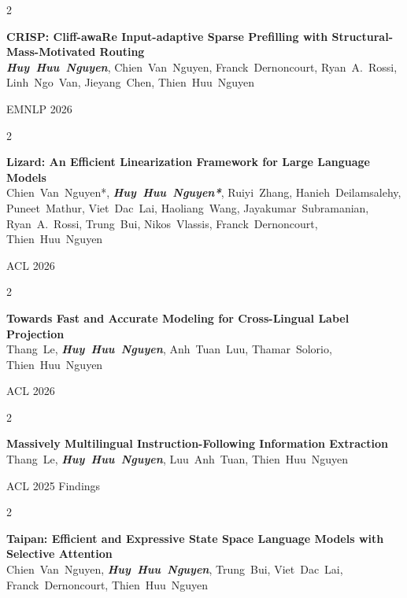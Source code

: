 \documentclass[10pt, letterpaper]{article}
\newenvironment{twocolentry}[2][]{
    \onecolentry
    \def\secondColumn{#2}
    \setcolumnwidth{\fill, 4.5 cm}
    \begin{paracol}{2}
}{
    \switchcolumn \raggedleft \secondColumn
    \end{paracol}
    \endonecolentry
} %
\let\hrefWithoutArrow\href
\renewcommand{\href}[2]{\hrefWithoutArrow{#1}{\ifthenelse{\equal{#2}{}}{ }{#2 }\raisebox{.15ex}{\footnotesize \faExternalLink*}}}
\begin{document}
\begin{samepage}
    \begin{twocolentry}{EMNLP 2026}
        \textbf{CRISP: Cliff-awaRe Input-adaptive Sparse Prefilling with Structural-Mass-Motivated Routing} \\
        \mbox{\textbf{\textit{Huy Huu Nguyen}}}, \mbox{Chien Van Nguyen}, \mbox{Franck Dernoncourt}, \mbox{Ryan A. Rossi}, \mbox{Linh Ngo Van}, \mbox{Jieyang Chen}, \mbox{Thien Huu Nguyen}
    \end{twocolentry}

    \vspace{0.10 cm}

    \begin{twocolentry}{ACL 2026}
        \textbf{Lizard: An Efficient Linearization Framework for Large Language Models} \\
        \mbox{Chien Van Nguyen*}, \mbox{\textbf{\textit{Huy Huu Nguyen*}}}, \mbox{Ruiyi Zhang}, \mbox{Hanieh Deilamsalehy}, \mbox{Puneet Mathur}, \mbox{Viet Dac Lai}, \mbox{Haoliang Wang}, \mbox{Jayakumar Subramanian}, \mbox{Ryan A. Rossi}, \mbox{Trung Bui}, \mbox{Nikos Vlassis}, \mbox{Franck Dernoncourt}, \mbox{Thien Huu Nguyen}
    \end{twocolentry}

    \vspace{0.10 cm}

    \begin{twocolentry}{ACL 2026}
        \textbf{Towards Fast and Accurate Modeling for Cross-Lingual Label Projection} \\
        \mbox{Thang Le}, \mbox{\textbf{\textit{Huy Huu Nguyen}}}, \mbox{Anh Tuan Luu}, \mbox{Thamar Solorio}, \mbox{Thien Huu Nguyen}
    \end{twocolentry}

    \vspace{0.10 cm}

    \begin{twocolentry}{ACL 2025 Findings}
        \textbf{Massively Multilingual Instruction-Following Information Extraction} \\
        \mbox{Thang Le}, \mbox{\textbf{\textit{Huy Huu Nguyen}}}, \mbox{Luu Anh Tuan}, \mbox{Thien Huu Nguyen}
    \end{twocolentry}

    \vspace{0.10 cm}

    \begin{twocolentry}{\href{https://arxiv.org/pdf/2410.18572}{Arxiv}}
        \textbf{Taipan: Efficient and Expressive State Space Language Models with Selective Attention} \\
        \mbox{Chien Van Nguyen}, \mbox{\textbf{\textit{Huy Huu Nguyen}}}, \mbox{Trung Bui}, \mbox{Viet Dac Lai}, \mbox{Franck Dernoncourt}, \mbox{Thien Huu Nguyen}
    \end{twocolentry}


\end{samepage}
\end{document}
